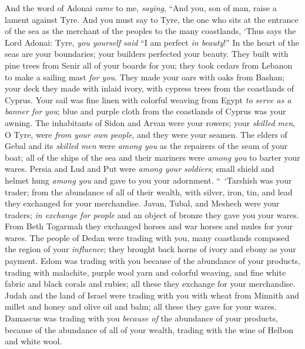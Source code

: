 \begin{biblechapter} %
 And the word of Adonai \textit{came} to me, \textit{saying},
\verse “And you, son of man, raise a lament against Tyre.
\verse And you must say to Tyre, the one who sits at the entrance of the sea as the merchant of the peoples to the many coastlands, ‘Thus says the Lord Adonai:
\verse Tyre, \textit{you yourself said} 
“I am perfect \textit{in beauty}!”
\verse In the heart of the seas are your boundaries; 
your builders perfected your beauty.
\verse They built with pine trees from Senir 
all of your boards for you; 
they took cedars from Lebanon 
to make a sailing mast \textit{for you}.
\verse They made your oars 
with oaks from Bashan; 
your deck they made with inlaid ivory, 
with cypress trees from the coastlands of Cyprus.
\verse Your sail was fine linen with colorful weaving from Egypt 
\textit{to serve as a banner for you}; 
blue and purple cloth from the coastlands of Cyprus 
was your awning.
\verse The inhabitants of Sidon and Arvan 
were your rowers; 
your \textit{skilled men}, O Tyre, were \textit{from your own people}, 
and they were your seamen.
\verse The elders of Gebal and its \textit{skilled men} were \textit{among you} 
as the repairers of the seam of your boat; 
all of the ships of the sea and their mariners were \textit{among you} 
to barter your wares.
\verse Persia and Lud and Put 
were \textit{among your soldiers}; 
small shield and helmet hung \textit{among you} 
and gave to you your adornment.
\verse “ ‘Tarshish was your trader; from the abundance of all of their wealth, with silver, iron, tin, and lead they exchanged for your merchandise.
\verse Javan, Tubal, and Meshech were your traders; \textit{in exchange for people} and an object of bronze they gave you your wares.
\verse From Beth Togarmah they exchanged horses and war horses and mules for your wares.
\verse The people of Dedan were trading with you, many coastlands composed the region of your \textit{influence}; they brought back horns of ivory and ebony as your payment.
\verse Edom was trading with you because of the abundance of your products, trading with malachite, purple wool yarn and colorful weaving, and fine white fabric and black corals and rubies; all these they exchange for your merchandise.
\verse Judah and the land of Israel were trading with you with wheat from Minnith and millet and honey and olive oil and balm; all these they gave for your wares.
\verse Damascus was trading with you \textit{because of} the abundance of your products, because of the abundance of all of your wealth, trading with the wine of Helbon and white wool.

\end{biblechapter}
